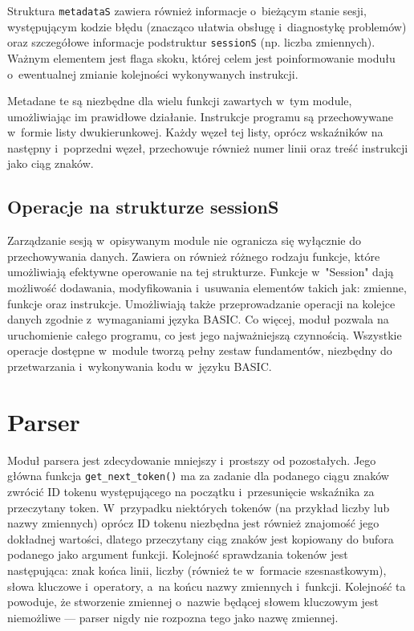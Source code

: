 \documentclass[shortabstract]{iithesis}
\begin{document}
Struktura \texttt{metadataS} zawiera również informacje o~bieżącym stanie sesji, występującym kodzie błędu (znacząco ułatwia obsługę i~diagnostykę problemów) oraz szczegółowe informacje podstruktur \texttt{sessionS} (np. liczba zmiennych). Ważnym elementem jest flaga skoku, której celem jest poinformowanie modułu o~ewentualnej zmianie kolejności wykonywanych instrukcji.

Metadane te są niezbędne dla wielu funkcji zawartych w~tym module, umożliwiając im prawidłowe działanie.
Instrukcje programu są przechowywane w~formie listy dwukierunkowej. Każdy węzeł tej listy, oprócz wskaźników na następny i~poprzedni węzeł, przechowuje również numer linii oraz treść instrukcji jako ciąg znaków.
\subsection{Operacje na strukturze sessionS}
Zarządzanie sesją w~opisywanym module nie ogranicza się wyłącznie do przechowywania danych. Zawiera on również różnego rodzaju funkcje, które umożliwiają efektywne operowanie na tej strukturze. Funkcje w~"Session" dają możliwość dodawania, modyfikowania i~usuwania elementów takich jak: zmienne, funkcje oraz instrukcje. Umożliwiają także przeprowadzanie operacji na kolejce danych zgodnie z~wymaganiami języka BASIC. Co więcej, moduł pozwala na uruchomienie całego programu, co jest jego najważniejszą czynnością. Wszystkie operacje dostępne w~module tworzą pełny zestaw fundamentów, niezbędny do przetwarzania i~wykonywania kodu w~języku BASIC.

\section{Parser}
Moduł parsera jest zdecydowanie mniejszy i~prostszy od pozostałych. Jego główna funkcja \texttt{get\_next\_token()} ma za zadanie dla podanego ciągu znaków zwrócić ID tokenu występującego na początku i~przesunięcie wskaźnika za przeczytany token. W~przypadku niektórych tokenów (na przykład liczby lub nazwy zmiennych) oprócz ID  tokenu niezbędna jest również znajomość jego dokładnej wartości, dlatego przeczytany ciąg znaków jest kopiowany do bufora podanego jako argument funkcji. Kolejność sprawdzania tokenów jest następująca: znak końca linii, liczby (również te w~formacie szesnastkowym), słowa kluczowe i~operatory, a~na końcu nazwy zmiennych i~funkcji. Kolejność ta powoduje, że stworzenie zmiennej o~nazwie będącej słowem kluczowym jest niemożliwe --- parser nigdy nie rozpozna tego jako nazwę zmiennej.
\end{document}
